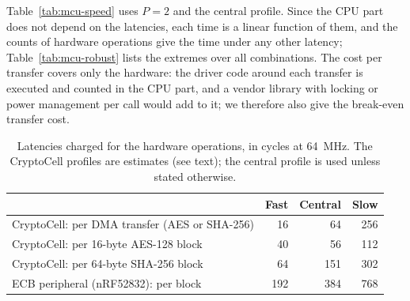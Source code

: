 Table~\ref{tab:mcu-speed} uses $P = 2$ and the central profile. Since the
CPU part does not depend on the latencies, each time is a linear function of
them, and the counts of hardware operations give the time under any other
latency; Table~\ref{tab:mcu-robust} lists the extremes over all combinations.
The cost per transfer covers only the hardware: the driver code around
each transfer is executed and counted in the CPU part, and a vendor library
with locking or power management per call would add to it; we therefore also
give the break-even transfer cost.

\begin{table}[!hbt]
\caption{Latencies charged for the hardware operations, in cycles at 64~MHz.
The CryptoCell profiles are estimates (see text); the central profile is
used unless stated otherwise.}
\label{tab:mcu-latency}
\centering
\small
\renewcommand{\arraystretch}{1.25}
\begin{tabular}{lrrr}
\hline
 & Fast & Central & Slow \\
\hline\hline
CryptoCell: per DMA transfer (AES or SHA-256) & 16 & 64 & 256 \\
CryptoCell: per 16-byte AES-128 block & 40 & 56 & 112 \\
CryptoCell: per 64-byte SHA-256 block & 64 & 151 & 302 \\
\hline
ECB peripheral (nRF52832): per block & 192 & 384 & 768 \\
\hline
\end{tabular}
\end{table}

